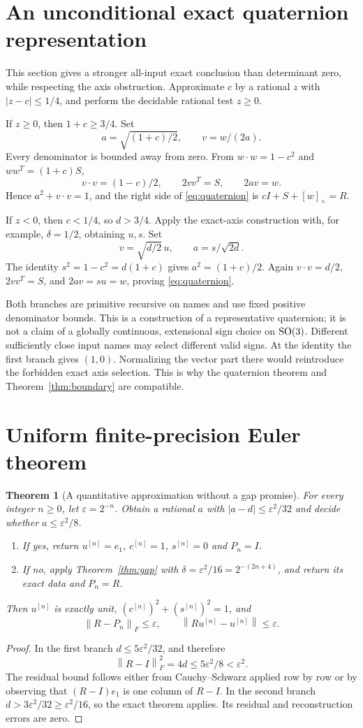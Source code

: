 \documentclass[11pt]{article}
\newtheorem{theorem}{Theorem}[section]
\theoremstyle{definition}\newtheorem{definition}[theorem]{Definition}
\newcommand{\norm}[1]{\left\lVert#1\right\rVert}
\newcommand{\crossmat}[1]{[#1]_{\times}}
\newcommand{\eps}{\varepsilon}
\begin{document}
\section{An unconditional exact quaternion representation}
\label{sec:quaternion}

This section gives a stronger all-input exact conclusion than determinant
zero, while respecting the axis obstruction. Approximate $c$ by a rational
$z$ with $|z-c|\le1/4$, and perform the decidable rational test $z\ge0$.

If $z\ge0$, then $1+c\ge3/4$. Set
\[
 a=\sqrt{(1+c)/2},\qquad v=w/(2a).
\]
Every denominator is bounded away from zero. From
$w\cdot w=1-c^2$ and $ww^T=(1+c)S$,
\[
 v\cdot v=(1-c)/2,\qquad 2vv^T=S,\qquad 2av=w.
\]
Hence $a^2+v\cdot v=1$, and the right side of
\eqref{eq:quaternion} is $cI+S+\crossmat w=R$.

If $z<0$, then $c<1/4$, so $d>3/4$. Apply the exact-axis construction
with, for example, $\delta=1/2$, obtaining $u,s$. Set
\[
 v=\sqrt{d/2}\,u,\qquad a=s/\sqrt{2d}.
\]
The identity $s^2=1-c^2=d(1+c)$ gives $a^2=(1+c)/2$.
Again $v\cdot v=d/2$, $2vv^T=S$, and $2av=su=w$, proving
\eqref{eq:quaternion}.

Both branches are primitive recursive on names and use fixed positive
denominator bounds. This is a construction of a representative quaternion;
it is not a claim of a globally continuous, extensional sign choice on
$\operatorname{SO}(3)$. Different sufficiently close input names may select different
valid signs. At the identity the first branch gives $(1,0)$.
Normalizing the vector part there would reintroduce the forbidden exact
axis selection. This is why the quaternion theorem and
Theorem~\ref{thm:boundary} are compatible.

\section{Uniform finite-precision Euler theorem}
\label{sec:approximate}

\begin{theorem}[A quantitative approximation without a gap promise]
For every integer $n\ge0$, let $\eps=2^{-n}$. Obtain a rational $a$ with
$|a-d|\le\eps^2/32$ and decide whether $a\le\eps^2/8$.
\begin{enumerate}[label=(\alph*)]
\item If yes, return $u^{[n]}=e_1$, $c^{[n]}=1$, $s^{[n]}=0$ and $P_n=I$.
\item If no, apply Theorem~\ref{thm:gap} with
$\delta=\eps^2/16=2^{-(2n+4)}$, and return its exact data and $P_n=R$.
\end{enumerate}
Then $u^{[n]}$ is exactly unit, $(c^{[n]})^2+(s^{[n]})^2=1$, and
\[
 \norm{R-P_n}_F\le\eps,\qquad
 \norm{Ru^{[n]}-u^{[n]}}\le\eps.
\]
\end{theorem}
\begin{proof}
In the first branch $d\le5\eps^2/32$, and therefore
\[
 \norm{R-I}_F^2=4d\le5\eps^2/8<\eps^2.
\]
The residual bound follows either from Cauchy--Schwarz applied row by row
or by observing that $(R-I)e_1$ is one column of $R-I$.
In the second branch $d>3\eps^2/32\ge\eps^2/16$, so the exact theorem
applies. Its residual and reconstruction errors are zero.
\end{proof}
\end{document}
